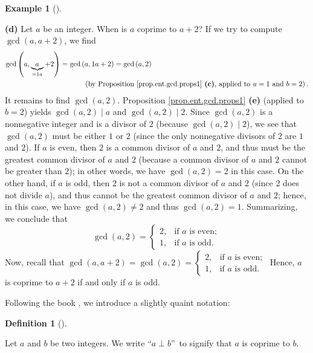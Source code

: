 \documentclass[numbers=enddot,12pt,final,onecolumn,notitlepage]{scrartcl}%
\numberwithin{exer}{subsection}
\theoremstyle{definition}
\newtheorem{defi}[theo]{Definition}
\newenvironment{definition}[1][]
{\begin{defi}[#1]\begin{leftbar}}
{\end{leftbar}\end{defi}}
\newtheorem{exam}[theo]{Example}
\newenvironment{example}[1][]
{\begin{exam}[#1]\begin{leftbar}}
{\end{leftbar}\end{exam}}
\begin{document}
\begin{example}
\textbf{(d)} Let $a$ be an integer. When is $a$ coprime to $a+2$? If we try to
compute $\gcd\left(  a,a+2\right)  $, we find%
\begin{align*}
\gcd\left(  a,\underbrace{a}_{=1a}+2\right)   &  =\gcd\left(  a,1a+2\right)
=\gcd\left(  a,2\right) \\
&  \ \ \ \ \ \ \ \ \ \ \left(  \text{by Proposition \ref{prop.ent.gcd.props1}
\textbf{(c)}, applied to }u=1\text{ and }b=2\right)  .
\end{align*}
It remains to find $\gcd\left(  a,2\right)  $. Proposition
\ref{prop.ent.gcd.props1} \textbf{(e)} (applied to $b=2$) yields $\gcd\left(
a,2\right)  \mid a$ and $\gcd\left(  a,2\right)  \mid2$. Since $\gcd\left(
a,2\right)  $ is a nonnegative integer and is a divisor of $2$ (because
$\gcd\left(  a,2\right)  \mid2$), we see that $\gcd\left(  a,2\right)  $ must
be either $1$ or $2$ (since the only nonnegative divisors of $2$ are $1$ and
$2$). If $a$ is even, then $2$ is a common divisor of $a$ and $2$, and thus
must be the greatest common divisor of $a$ and $2$ (because a common divisor
of $a$ and $2$ cannot be greater than $2$); in other words, we have
$\gcd\left(  a,2\right)  =2$ in this case. On the other hand, if $a$ is odd,
then $2$ is not a common divisor of $a$ and $2$ (since $2$ does not divide
$a$), and thus cannot be the greatest common divisor of $a$ and $2$; hence, in
this case, we have $\gcd\left(  a,2\right)  \neq2$ and thus $\gcd\left(
a,2\right)  =1$. Summarizing, we conclude that%
\[
\gcd\left(  a,2\right)  =%
\begin{cases}
2, & \text{if }a\text{ is even};\\
1, & \text{if }a\text{ is odd.}%
\end{cases}
\]
Now, recall that $\gcd\left(  a,a+2\right)  =\gcd\left(  a,2\right)  =%
\begin{cases}
2, & \text{if }a\text{ is even};\\
1, & \text{if }a\text{ is odd.}%
\end{cases}
$ Hence, $a$ is coprime to $a+2$ if and only if $a$ is odd.
\end{example}

Following the book \cite{GKP}, we introduce a slightly quaint notation:

\begin{definition}
\label{def.ent.coprime.perp}Let $a$ and $b$ be two integers. We write
\textquotedblleft$a\perp b$\textquotedblright\ to signify that $a$ is coprime
to $b$.
\end{definition}
\end{document}
